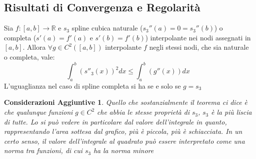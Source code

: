 \documentclass[11pt,a4paper,twoside]{article}
\newtheorem*{cons}{Considerazioni Aggiuntive}
\theoremstyle{definition}
\begin{document}
\subsection{Risultati di Convergenza e Regolarità}

\begin{thm}{}{}
	Sia $f:[a,b] \to \mathbb R$ e $s_3$ spline cubica naturale ($s_3''(a) = 0 = s_3''(b)$) o completa ($s'(a) = f'(a)$ e $s'(b) = f'(b)$) interpolante nei nodi assegnati in $[a,b]$. Allora $\forall g \in C^2([a,b])$ interpolante $f$ negli stessi nodi, che sia naturale o completa, vale:
	\[ \int_a^b \left(s''_3(x)\right)^2dx \leq \int_a^b \left(g''(x)\right)dx\]
	L'uguaglianza nel caso di spline completa si ha se e solo se $g = s_3$
\end{thm}

\begin{cons}
	Quello che sostanzialmente il teorema ci dice è che qualunque funzioni $g \in C^2$ che abbia le stesse proprietà di $s_3$, $s_3$ è la più liscia di tutte. Lo si può vedere in particolare dal valore dell'integrale in quanto, rappresentando l'area sottesa dal grafico, più è piccola, più è schiacciata. In un certo senso, il valore dell'integrale al quadrato può essere interpretato come una norma tra funzioni, di cui $s_3$ ha la norma minore
\end{cons}
\end{document}
